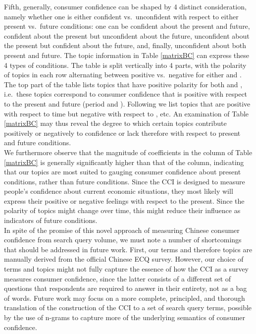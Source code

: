 \documentclass[10pt]{article}
\begin{document}
Fifth, generally, consumer confidence can be shaped by 4 distinct consideration, namely whether one is either confident vs.~unconfident with respect to either present vs.~future conditions: one can be confident about the present and future, confident about the present but unconfident about the future, unconfident about the present but confident about the future, and, finally, unconfident about both present and future. The topic information in Table \ref{matrixBC} can express these 4 types of conditions. The table is split vertically into 4 parts, with the polarity of topics in each row alternating between positive vs.~negative for either  and . The top part of the table lists topics that have positive polarity for both  and , i.e.~these topics correspond to consumer confidence that is positive with respect to the present and future (period  and ). Following we list topics that are positive with respect to time  but negative with respect to , etc. An examination of Table \ref{matrixBC} may thus reveal the degree to which certain topics contribute positively or negatively to confidence or lack therefore with respect to present and future conditions.\\

We furthermore observe that the magnitude of coefficients in the  column of Table \ref{matrixBC} is generally significantly higher than that of the  column, indicating that our topics are most suited to gauging consumer confidence about present conditions, rather than future conditions. Since the CCI is designed to measure people's confidence about current economic situations, they most likely will express their positive or negative feelings with respect to the present.  Since the polarity of topics might change over time, this might reduce their influence as indicators of future conditions.\\

In spite of the promise of this novel approach of measuring Chinese consumer confidence from search query volume, we must note a number of shortcomings that should be addressed in future work.
First, our terms and therefore topics are manually derived from the official Chinese ECQ survey. However, our choice of terms and topics might not fully capture the essence of how the CCI as a survey measures consumer confidence, since the latter consists of a different set of questions that respondents are required to answer in their entirety, not as a bag of words. Future work may focus on a more complete, principled, and thorough translation of the construction of the CCI to a set of search query terms, possible by the use of n-grams to capture more of the underlying semantics of consumer confidence.\\
\end{document}
